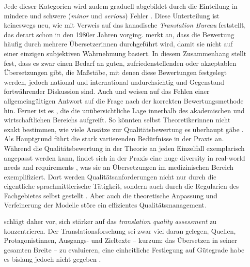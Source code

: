 Jede dieser Kategorien wird zudem graduell abgebildet durch die Einteilung in mindere und schwere (\emph{minor} und \emph{serious}) Fehler \citep[24]{dalla-zuanna_direkte_2010}. Diese Unterteilung ist keineswegs neu, wie \citet[237]{martin_martin_sobre_2010} mit Verweis auf das kanadische \emph{Translation Bureau} feststellt, das derart schon in den 1980er Jahren vorging. \citet[653]{carstensen_computerlinguistik_2010} merkt an, dass die Bewertung häufig durch mehrere Übersetzer{\textperiodcentered}innen durchgeführt wird, damit sie nicht auf einer einzigen subjektiven Wahrnehmung basiert. In diesem Zusammenhang stellt \citet[3]{williams_translation_2009} fest, dass es zwar einen Bedarf an guten, zufriedenstellenden oder akzeptablen Übersetzungen gibt, die Maßstäbe, mit denen diese Bewertungen festgelegt werden, jedoch national und international undurchsichtig und Gegenstand fortwährender Diskussion sind. Auch \citet[217]{koehn_statistical_2009} und \citet[251]{king_evaluating_1997} weisen auf das Fehlen einer allgemeingültigen Antwort auf die Frage nach der korrekten Bewertungsmethode hin. Ferner ist es \citet[36]{drugan_quality_2013}, die die unübersichtliche Lage innerhalb des akademischen und wirtschaftlichen Bereichs aufgreift. So könnten selbst Theoretiker{\textperiodcentered}innen nicht exakt bestimmen, wie viele Ansätze zur Qualitätsbewertung es überhaupt gäbe \citet[36]{drugan_quality_2013}. Als Hauptgrund führt \citeauthor{drugan_quality_2013} die stark variierenden Bedürfnisse in der Praxis an. Während die Qualitätsbewertung in der Theorie an jeden Einzelfall exemplarisch angepasst werden kann, findet sich in der Praxis eine \glqq huge diversity in real-world needs and requirements\grqq{} \citep[37]{drugan_quality_2013}, was sie an Übersetzungen im medizinischen Bereich exemplifiziert. Dort werden Qualitätsanforderungen nicht nur durch die eigentliche sprachmittlerische Tätigkeit, sondern auch durch die Regularien des Fachgebietes selbst gestellt \citep[37]{drugan_quality_2013}. Aber auch die theoretische Anpassung und Verfeinerung der Modelle störe ein effizientes Qualitätsmanagement.

\citeauthor{williams_translation_2009} schlägt daher vor, sich stärker auf das \emph{translation quality assessment} zu konzentrieren. Der Translationsforschung sei zwar viel daran gelegen, Quellen, Protagonist{\textperiodcentered}innen, Ausgangs- und Zieltexte -- kurzum: das Übersetzen in seiner gesamten Breite -- zu evaluieren, eine einheitliche Festlegung auf Gütegrade habe es bislang jedoch nicht gegeben \citep[4]{williams_translation_2009}.


